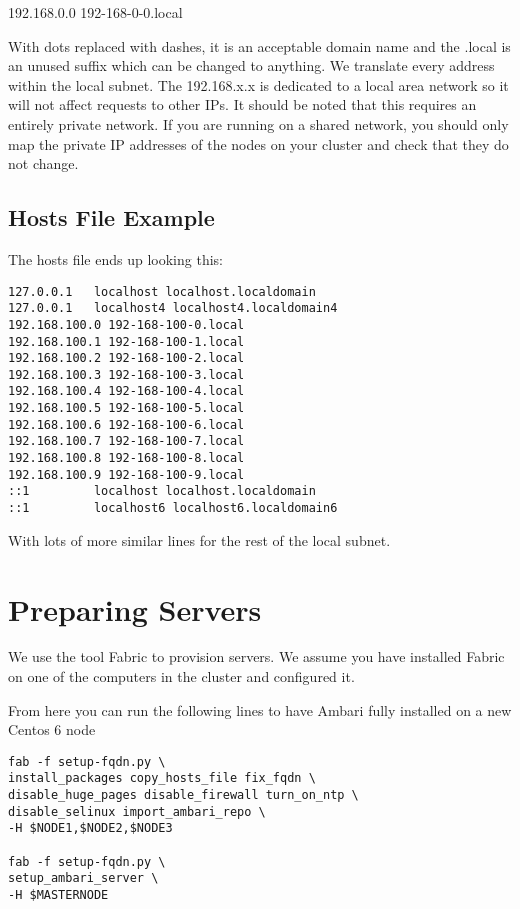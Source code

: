 \documentclass[9pt,twocolumn,twoside]{idsi}
\begin{document}
192.168.0.0 192-168-0-0.local

With dots replaced with dashes, it is an acceptable domain name and the .local is an unused suffix which can be changed to anything. We translate every address within the local subnet. The 192.168.x.x is dedicated to a local area network so it will not affect requests to other IPs. It should be noted that this requires an entirely private network. If you are running on a shared network, you should only map the private IP addresses of the nodes on your cluster and check that they do not change.


\subsection{Hosts File Example}

The hosts file ends up looking this:
\begin{verbatim}
127.0.0.1   localhost localhost.localdomain
127.0.0.1   localhost4 localhost4.localdomain4
192.168.100.0 192-168-100-0.local
192.168.100.1 192-168-100-1.local
192.168.100.2 192-168-100-2.local
192.168.100.3 192-168-100-3.local
192.168.100.4 192-168-100-4.local
192.168.100.5 192-168-100-5.local
192.168.100.6 192-168-100-6.local
192.168.100.7 192-168-100-7.local
192.168.100.8 192-168-100-8.local
192.168.100.9 192-168-100-9.local
::1         localhost localhost.localdomain 
::1         localhost6 localhost6.localdomain6
\end{verbatim}

With lots of more similar lines for the rest of the local subnet.

\section{Preparing Servers}

We use the tool Fabric to provision servers. We assume you have installed Fabric on one of the computers in the cluster and configured it.

From here you can run the following lines to have Ambari fully installed on a new Centos 6 node

\begin{verbatim}
fab -f setup-fqdn.py \
install_packages copy_hosts_file fix_fqdn \
disable_huge_pages disable_firewall turn_on_ntp \
disable_selinux import_ambari_repo \
-H $NODE1,$NODE2,$NODE3

fab -f setup-fqdn.py \
setup_ambari_server \
-H $MASTERNODE

\end{verbatim}
\end{document}
